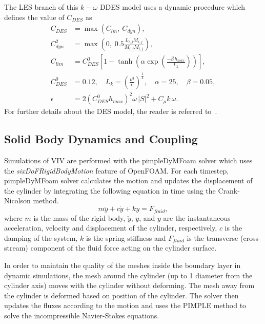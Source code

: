 The LES branch of this $k-\omega$ DDES model uses a dynamic procedure which
defines the value of $C_{DES}$ as
%
\begin{align}
  C_{DES}   & =  \max( C_{lm},~C_{dyn} ), \nonumber \\
  C_{dyn}^2 & = \max \left( 0,\; 0.5 \frac{L_{i,j} M_{i,j}}{M_{i,j} M_{i,j}}\right), \nonumber \\
  C_{lim}   &=C_{DES}^0 \left[1-\tanh \left(\alpha \exp \left(\frac{-\beta \, h_{max}}{L_k}\right)\right)\right],\\
  C_{DES}^0 &=0.12, \quad   L_k=\left(\frac{\nu^3}{\epsilon}\right)^{\frac{1}{4}},  \quad  \alpha=25,  \quad  \beta=0.05, \nonumber \\
  \epsilon  &= 2 \left(C_{DES}^0 h_{max} \right)^2 \omega\,|S|^2+C_\mu k\,\omega. \nonumber
\end{align}  
%
For further details about the DES model, the reader is referred
to~\cite{yin2015dynamic}.

\subsection{Solid Body Dynamics and Coupling}
\label{sec:coupling}
%
Simulations of VIV are performed with the pimpleDyMFoam solver which uses the
{\em sixDoFRigidBodyMotion} feature of OpenFOAM. For each timestep,
pimpleDyMFoam solver calculates the motion and updates the displacement of the
cylinder by integrating the following equation in time using the Crank-Nicolson
method.
%
\begin{equation}
  m\ddot{y} + c\dot{y} + ky = F_{fluid},
  \label{eq:solidBodyDynamics}
\end{equation}
%
where $m$ is the mass of the rigid body, $\ddot{y}$, $\dot{y}$, and $y$ are the
instantaneous acceleration, velocity and displacement of the cylinder,
respectively, $c$ is the damping of the system, $k$ is the spring stiffness and
$F_{fluid}$ is the transverse (cross-stream) component of the fluid force
acting on the cylinder surface.

In order to maintain the quality of the meshes inside the boundary layer in
dynamic simulations, the mesh around the cylinder (up to 1 diameter from the
cylinder axis) moves with the cylinder without deforming. The mesh away from
the cylinder is deformed based on position of the cylinder. The solver then
updates the fluxes according to the motion and uses the PIMPLE method to solve
the incompressible Navier-Stokes equations.


